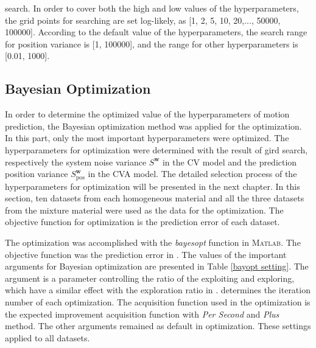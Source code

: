 \FloatBarrier


search. In order to cover both the high and low values of the hyperparameters, the grid points for searching are set log-likely, as [1, 2, 5, 10, 20,..., 50000, 100000]. According to the default value of the hyperparameters, the search range for position variance is [1, 100000], and the range for other hyperparameters is [0.01, 1000]. 




\subsection{Bayesian Optimization}



In order to determine the optimized value of the hyperparameters of motion prediction, the Bayesian optimization method was applied for the optimization. In this part, only the most important hyperparameters were optimized. The hyperparameters for optimization were determined with the result of gird search, respectively the system noise variance $S^{\boldsymbol{w}}$ in the CV model and the prediction position variance $S_{\mathrm{pos}}^{\boldsymbol{w}}$ in the CVA model. The detailed selection process of the hyperparameters for optimization will be presented in the next chapter. In this section, ten datasets from each homogeneous material and all the three datasets from the mixture material were used as the data for the optimization. The objective function for optimization is the prediction error of each dataset.

The optimization was accomplished with the \textit{bayesopt} function in \textsc{Matlab}. The objective function was the prediction error in . The values of the important arguments for Bayesian optimization are presented in Table \ref{bayopt setting}. The argument  is a parameter controlling the ratio of the exploiting and exploring, which have a similar effect with the exploration ratio in .  determines the iteration number of each optimization. The acquisition function used in the optimization is the expected improvement acquisition function with \textit{Per Second} and \textit{Plus} method. The other arguments remained as default in optimization. These settings applied to all datasets.

